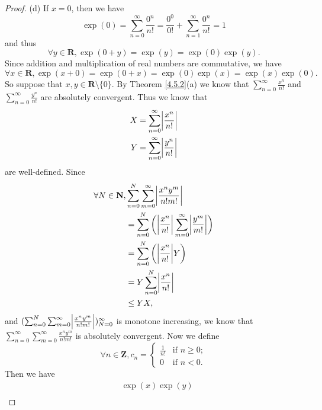 \begin{proof}{(d)}
    If \(x = 0\), then we have
    \[
        \exp(0) = \sum_{n = 0}^\infty \frac{0^n}{n!} = \frac{0^0}{0!} + \sum_{n = 1}^\infty \frac{0^n}{n!} = 1
    \]
    and thus
    \[
        \forall y \in \mathbf{R}, \exp(0 + y) = \exp(y) = \exp(0) \exp(y).
    \]
    Since addition and multiplication of real numbers are commutative, we have
    \[
        \forall x \in \mathbf{R}, \exp(x + 0) = \exp(0 + x) = \exp(0) \exp(x) = \exp(x) \exp(0).
    \]
    So suppose that \(x, y \in \mathbf{R} \setminus \{0\}\).
    By Theorem \ref{4.5.2}(a) we know that \(\sum_{n = 0}^\infty \frac{x^n}{n!}\) and \(\sum_{n = 0}^\infty \frac{y^n}{n!}\) are absolutely convergent.
    Thus we know that
    \begin{align*}
        X & = \sum_{n = 0}^\infty \abs*{\frac{x^n}{n!}} \\
        Y & = \sum_{n = 0}^\infty \abs*{\frac{y^n}{n!}}
    \end{align*}
    are well-defined.
    Since
    \begin{align*}
        \forall N \in \mathbf{N}, & \sum_{n = 0}^N \sum_{m = 0}^\infty \abs*{\frac{x^n y^m}{n! m!}}                              \\
                                  & = \sum_{n = 0}^N \bigg(\abs*{\frac{x^n}{n!}} \sum_{m = 0}^\infty \abs*{\frac{y^m}{m!}}\bigg) \\
                                  & = \sum_{n = 0}^N \bigg(\abs*{\frac{x^n}{n!}} Y\bigg)                                         \\
                                  & = Y \sum_{n = 0}^N \abs*{\frac{x^n}{n!}}                                                     \\
                                  & \leq Y X,
    \end{align*}
    and \((\sum_{n = 0}^N \sum_{m = 0}^\infty \abs*{\frac{x^n y^m}{n! m!}})_{N = 0}^\infty\) is monotone increasing, we know that \(\sum_{n = 0}^\infty \sum_{m = 0}^\infty \frac{x^n y^m}{n! m!}\) is absolutely convergent.
    Now we define
    \[
        \forall n \in \mathbf{Z}, c_n = \begin{cases}
            \frac{1}{n!} & \text{if } n \geq 0; \\
            0            & \text{if } n < 0.
        \end{cases}
    \]
    Then we have
    \begin{align*}
         & \exp(x) \exp(y)                                                                                                                            \\

\end{align*}
\end{proof}
